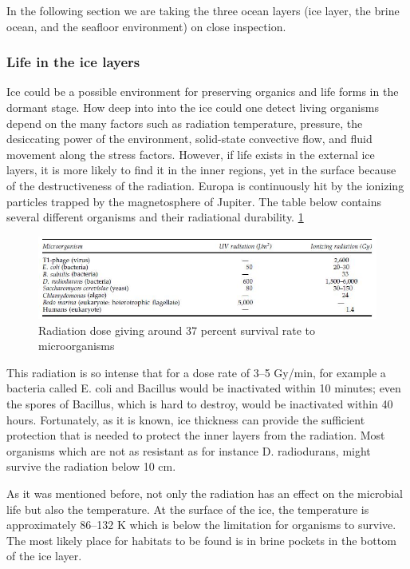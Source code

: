 In the following section we are taking the three ocean layers (ice layer, the brine ocean, and the seafloor environment) on close inspection.

\subsubsection{Life in the ice layers}

Ice could be a possible environment for preserving organics and life forms in the dormant stage. How deep into into the ice could one detect living organisms depend on the many factors such as radiation temperature, pressure, the desiccating power of the environment, solid-state convective flow, and fluid movement along the stress factors. However, if life exists in the external ice layers, it is more likely to find it in the inner regions, yet in the surface because of the destructiveness of the radiation.
Europa is continuously hit by the ionizing particles trapped by the magnetosphere of Jupiter. The table below contains several different organisms and their radiational durability. 
\ref{fig:Organisms_rad_durability}

\begin{figure}[htb]
  \centering
  \includegraphics[scale=.8]{figures/BFfig/Organisms_rad_durability}
  \caption{Radiation dose giving around 37 percent survival rate to microorganisms}
  \label{fig:Organisms_rad_durability}
\end{figure}


This radiation is so intense that for a  dose rate of 3–5 Gy/min, for example a bacteria called E. coli and Bacillus would be inactivated within 10 minutes; even the spores of Bacillus, which is hard to destroy, would be inactivated within 40 hours.
Fortunately, as it is known, ice thickness can provide the sufficient protection that is needed to protect the inner layers from the radiation. Most organisms which are not as resistant as for instance D. radiodurans, might survive the radiation below 10 cm.

As it was mentioned before, not only the radiation has an effect on the microbial life but also the temperature. At the surface of the ice, the temperature is approximately 86–132 K which is below the limitation for organisms to survive. The most likely place for habitats to be found is in brine pockets in the bottom of the ice layer.

